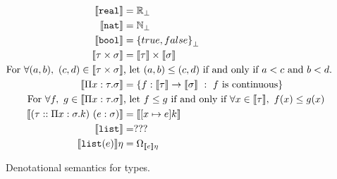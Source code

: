 \begin{figure}
 \begin{align*}
\llbracket \texttt{real} \rrbracket &= \mathbb{R}_{\perp} \\
\llbracket \texttt{nat} \rrbracket &= \mathbb{N}_{\perp} \\
 \llbracket \texttt{bool} \rrbracket &= {\{true, false\}}_{\perp} \\
 \llbracket \tau \times \sigma \rrbracket &= \llbracket \tau \rrbracket \times \llbracket \sigma \rrbracket  \\
 \text{For } \forall (a, b), \ (c, d) \in \llbracket \tau \times \sigma \rrbracket &\text{, let }  (a,b) \leq (c,d) \text{ if and only if } a<c \text{ and } b<d. \\ 
 \llbracket \Pi x:\tau.\sigma \rrbracket &= \{f: \llbracket \tau \rrbracket \rightarrow \llbracket \sigma \rrbracket \ : 
 \ f \text{ is continuous}\} \\
 \text{ For } \forall f, \ g \in \llbracket \Pi x : \tau.\sigma \rrbracket &\text{, let } f \leq g \text{ if and only if } \forall x \in 
 \llbracket \tau \rrbracket, \ f(x) \leq g(x) \\
 \llbracket (\tau :: \Pi x: \sigma.k) \ (e : \sigma) \rrbracket &= \llbracket [x \mapsto e]k \rrbracket \\
 \llbracket \texttt{list} \rrbracket &= ??? \\
 \llbracket \texttt{list}(e) \rrbracket\eta &= \Omega_{\llbracket e \rrbracket\eta}
 \end{align*}
 \caption{Denotational semantics for types.}
 \end{figure}

